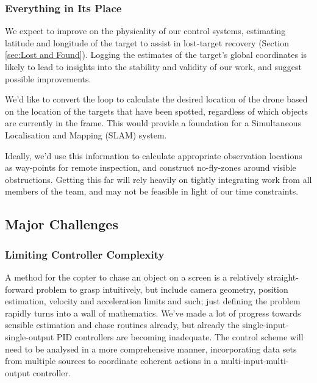 \documentclass[a4paper, 11pt, titlepage]{article}
\begin{document}
    \subsubsection{Everything in Its Place}      

      We expect to improve on the physicality of our control systems, estimating latitude and longitude of the target to assist in lost-target recovery (Section \ref{sec:Lost and Found}).  Logging the estimates of the target's global coordinates is likely to lead to insights into the stability and validity of our work, and suggest possible improvements.

      We'd like to convert the loop to calculate the desired location of the drone based on the location of the targets that have been spotted, regardless of which objects are currently in the frame.  This would provide a foundation for a Simultaneous Localisation and Mapping (SLAM) system.

      Ideally, we'd use this information to calculate appropriate observation locations as way-points for remote inspection, and construct no-fly-zones around visible obstructions.  Getting this far will rely heavily on tightly integrating work from all members of the team, and may not be feasible in light of our time constraints.

  \subsection{Major Challenges}
    \subsubsection{Limiting Controller Complexity}
      A method for the copter to chase an object on a screen is a relatively straight-forward problem to grasp intuitively, but include camera geometry, position estimation, velocity and acceleration limits and such; just defining the problem rapidly turns into a wall of mathematics.  We've made a lot of progress towards sensible estimation and chase routines already, but already the single-input-single-output PID controllers are becoming inadequate. The control scheme will need to be analysed in a more comprehensive manner, incorporating data sets from multiple sources to coordinate coherent actions in a multi-input-multi-output controller.
\end{document}
